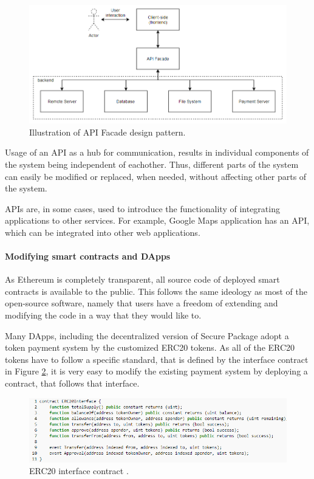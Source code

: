 \begin{figure}[H]
\centering
\includegraphics[scale=0.59]{images/facadeapi.png}
\caption{Illustration of API Facade design pattern.}
\label{fig:apipattern}
\end{figure}

Usage of an API as a hub for communication, results in individual components of the system being independent of eachother. Thus, different parts of the system can easily be modified or replaced, when needed, without affecting other parts of the system. 

APIs are, in some cases, used to introduce the functionality of integrating applications to other services. For example, Google Maps application has an API, which can be integrated into other web applications.

\paragraph{Modifying smart contracts and DApps}
As Ethereum is completely transparent, all source code of deployed smart contracts is available to the public. This follows the same ideology as most of the open-source software, namely that users have a freedom of extending and modifying the code in a way that they would like to. 

Many DApps, including the decentralized version of Secure Package adopt a token payment system by the customized ERC20 tokens. As all of the ERC20 tokens have to follow a specific standard, that is defined by the interface contract in Figure \ref{fig:erc20interface}, it is very easy to modify the existing payment system by deploying a contract, that follows that interface.

\begin{figure}[H]
\centering
\includegraphics[scale=0.69]{images/erc20.png}
\caption{ERC20 interface contract \textnormal{\citep{erc20}}.}
\label{fig:erc20interface}
\end{figure}